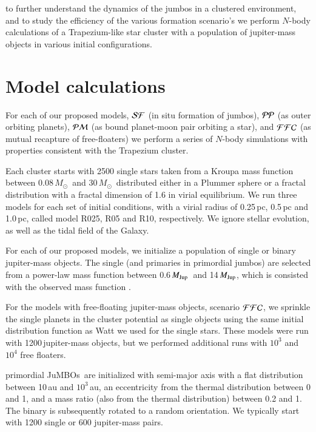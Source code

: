 \documentclass[aa]{lib/aa}
\newcommand{\MSun}{\mbox{${M}_\odot$}}
\newcommand{\MJup}{\mbox{${M}_{\rm Jup}$}}
\newcommand{\jumbos}{\mbox{JuMBOs}}
\begin{document}
to further understand the dynamics of the jumbos in a clustered
environment, and to study the efficiency of the various formation
scenario's we perform $N$-body calculations of a Trapezium-like star
cluster with a population of jupiter-mass objects in various initial
configurations.

\section{Model calculations}

For each of our proposed models, ${\cal SF}$ (in situ formation of
jumbos), ${\cal PP}$ (as outer orbiting planets), ${\cal PM}$ (as bound
planet-moon pair orbiting a star), and ${\cal FFC}$ (as mutual
recapture of free-floaters) we perform a series of $N$-body
simulations with properties consistent with the Trapezium cluster.

Each cluster starts with 2500 single stars taken from a Kroupa mass
function \cite{2002MNRAS.336.1188K} between 0.08\,\MSun\, and
$30$\,\MSun\, distributed either in a Plummer sphere or a fractal
distribution with a fractal dimension of 1.6 in virial equilibrium.  We
run three models for each set of initial conditions, with a virial
radius of 0.25\,pc, 0.5\,pc and 1.0\,pc, called model R025, R05 and
R10, respectively.  We ignore stellar evolution, as well as the
tidal field of the Galaxy.

For each of our proposed models, we initialize a population of single
or binary jupiter-mass objects. The single (and primaries in
primordial jumbos) are selected from a power-law mass function between
0.6\,\MJup\, and 14\,\MJup, which is consisted with the observed mass
function \cite{2023arXiv231001231P}.

For the models with free-floating jupiter-mass objects, scenario
${\cal FFC}$, we sprinkle the single planets in the cluster potential
as single objects using the same initial distribution function as Watt
we used for the single stars.  These models were run with
1200\,jupiter-mass objects, but we performed additional runs with
$10^3$ and $10^4$ free floaters.

primordial \jumbos\, are initialized with semi-major axis with a flat
distribution between 10\,au and $10^3$\,au, an eccentricity from the
thermal distribution between 0 and 1, and a mass ratio (also from the
thermal distribution) between 0.2 and 1.  The binary is subsequently
rotated to a random orientation. We typically start with 1200 single
or 600 jupiter-mass pairs.
\end{document}
